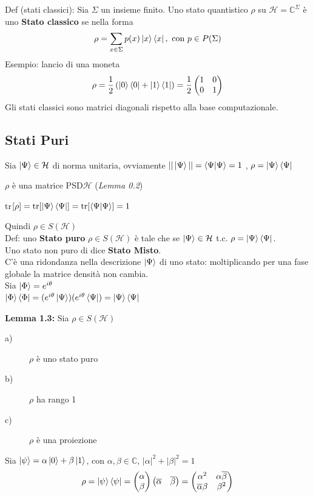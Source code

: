 \documentclass{report}
\begin{document}
\medskip
Def (stati classici): Sia $\Sigma$ un insieme finito. Uno stato quantistico $\rho$ su $\mathcal{H}= \mathbb{C}^\Sigma$ è uno \textbf{Stato classico} se nella forma $$\rho = \sum_{x\in \Sigma}p(x)\ket{x}\bra{x}, \text{ con } p\in P(\Sigma)$$
Esempio: lancio di una moneta 
$$\rho = \frac{1}{2}\left( \ket{0} \bra{0}+ \ket{1}\bra{1}\right)= 
\frac{1}{2}
\begin{pmatrix}
    1 & 0\\
    0 & 1
\end{pmatrix}
$$
Gli stati classici sono matrici diagonali rispetto alla base computazionale.

\subsection{Stati Puri}
Sia $\ket{\Psi} \in \mathcal{H}$ di norma unitaria, ovviamente $||\ket{\Psi}|| = \braket{\Psi|\Psi}=1$ , $\rho = \ket{\Psi} \bra{\Psi}$

\medskip
$\rho$ è una matrice PSD$\mathcal{H}$ (\textit{Lemma 0.2})

\medskip
tr$[\rho] = \text{tr}[\ket{\Psi}\bra{\Psi}]=\text{tr}[\braket{\Psi|\Psi}]=1$

\medskip
Quindi $\rho \in S(\mathcal{H})$
\medskip
\\Def: uno \textbf{Stato puro} $\rho \in S(\mathcal{H})$ è tale che se $\ket{\Psi} \in \mathcal{H}$ t.c. $\rho = \ket{\Psi}\bra{\Psi}$.
\\Uno stato non puro di dice \textbf{Stato Misto}.
\medskip
\\C'è una ridondanza  nella descrizione $\ket{\Psi}$ di uno stato: moltiplicando per una fase globale la matrice densità non cambia.
\\Sia $\ket{\Phi}= e^{i\theta}$
\medskip
\\ $\ket{\Phi}\bra{\Phi} = (e^{i\theta}\ket{\Psi})(e^{i\theta}\bra{\Psi})= \ket{\Psi} \bra{\Psi}$

\newpage
\textbf{Lemma 1.3:} Sia $\rho\in S(\mathcal{H})$
\begin{description}
    \item[a)] $\rho$ è uno stato puro
    \item[b)] $\rho$ ha rango 1
    \item[c)] $\rho$ è una proiezione
\end{description}

Sia $\ket{\psi}= \alpha\ket{0}+\beta\ket{1}$, con $\alpha, \beta \in \mathbb{C}$, $|\alpha|^2 + |\beta|^2=1$
$$\rho= \ket{\psi}\bra{\psi}= 
\begin{pmatrix}
    \alpha \\
    \beta
\end{pmatrix}
\begin{pmatrix}
    \overline{\alpha} & \overline{\beta}
\end{pmatrix}
= \begin{pmatrix}
    \alpha^2 & \alpha\overline{\beta}\\
    \overline{\alpha}\beta & \beta^2
\end{pmatrix}
$$
\end{document}
